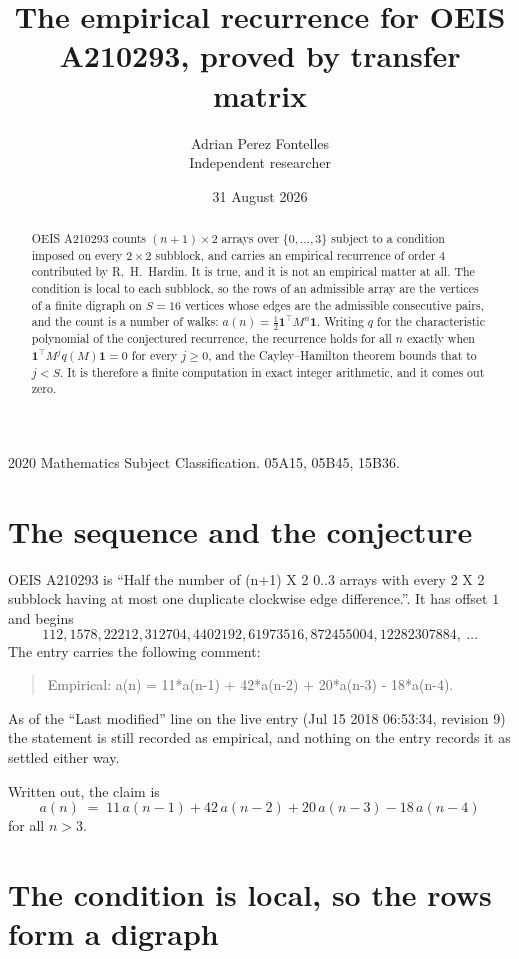 \documentclass[11pt,a4paper]{article}
\title{The empirical recurrence for OEIS A210293, proved by transfer matrix}
\author{Adrian Perez Fontelles\\ \small Independent researcher}
\date{31 August 2026}
\theoremstyle{plain}
\theoremstyle{definition}
\begin{document}
\maketitle

\begin{abstract}
OEIS A210293 counts $(n+1)\times2$ arrays over $\{0,\dots,3\}$ subject to a condition imposed on
every $2\times2$ subblock, and carries an empirical recurrence of order $4$ contributed
by R.~H.~Hardin. It is true, and it is not an empirical matter at all. The condition is local
to each subblock, so the rows of an admissible array are the vertices of a finite digraph
on $S=16$ vertices whose edges are the admissible consecutive pairs, and the count is a
number of walks: $a(n)=\tfrac1{2}\mathbf{1}^{\!\top}M^{n}\mathbf{1}$. Writing $q$
for the characteristic polynomial of the conjectured recurrence, the recurrence holds for all
$n$ exactly when $\mathbf{1}^{\!\top}M^{j}q(M)\mathbf{1}=0$ for every $j\ge0$, and the
Cayley--Hamilton theorem bounds that to $j<S$. It is therefore a finite computation in exact
integer arithmetic, and it comes out zero.
\end{abstract}

\noindent\small 2020 Mathematics Subject Classification. 05A15, 05B45, 15B36.\normalsize

\section{The sequence and the conjecture}

OEIS A210293 is ``Half the number of (n+1) X 2 0..3 arrays with every 2 X 2 subblock having at most one duplicate clockwise edge difference.''. It has offset $1$ and begins
\[
112, 1578, 22212, 312704, 4402192, 61973516, 872455004, 12282307884,\ \dots
\]
The entry carries the following comment:
\begin{quote}\small
Empirical: a(n) = 11*a(n-1) + 42*a(n-2) + 20*a(n-3) - 18*a(n-4).
\end{quote}
As of the ``Last modified'' line on the live entry (Jul 15 2018 06:53:34, revision 9) the statement is
still recorded as empirical, and nothing on the entry records it as settled either way.

Written out, the claim is
\begin{equation}\label{eq:conj}
a(n)\;=\;11\,a(n-1) + 42\,a(n-2) + 20\,a(n-3) - 18\,a(n-4)
\end{equation}
for all $n>3$.

\section{The condition is local, so the rows form a digraph}
\end{document}
